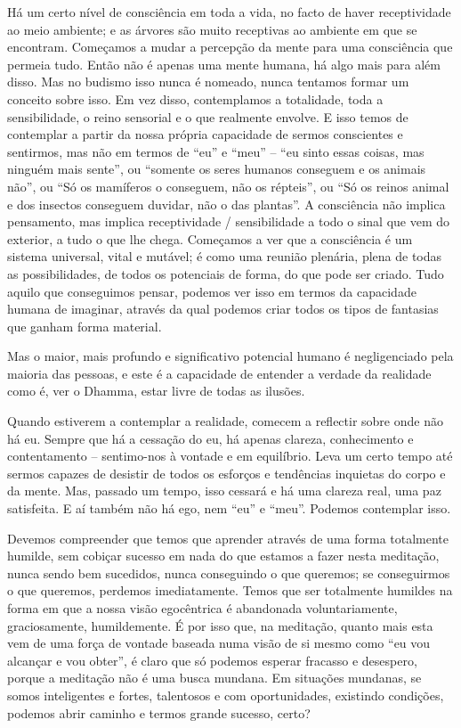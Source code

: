 Há um certo nível de consciência em toda a vida, no facto de haver receptividade
ao meio ambiente; e as árvores são muito receptivas ao ambiente em que se
encontram. Começamos a mudar a percepção da mente para uma consciência que
permeia tudo. Então não é apenas uma mente humana, há algo mais para além disso.
Mas no budismo isso nunca é nomeado, nunca tentamos formar um conceito sobre
isso. Em vez disso, contemplamos a totalidade, toda a sensibilidade, o reino
sensorial e o que realmente envolve. E isso temos de contemplar a partir da
nossa própria capacidade de sermos conscientes e sentirmos, mas não em termos de
``eu'' e ``meu'' -- ``eu sinto essas coisas, mas ninguém mais sente'', ou
``somente os seres humanos %
conseguem e os animais não'', ou ``Só os mamíferos o
conseguem, não os répteis'', ou ``Só os reinos animal e dos insectos conseguem
duvidar, não o das plantas''. A consciência não implica pensamento, mas implica
receptividade / sensibilidade a todo o sinal que vem do exterior, a tudo o que
lhe chega. Começamos a ver que a consciência é um sistema universal, vital e
mutável; é como uma reunião plenária, plena de todas as possibilidades, de todos
os potenciais de forma, do que pode ser criado. Tudo aquilo que conseguimos
pensar, podemos ver isso em termos da capacidade humana de imaginar, através da
qual podemos criar todos os tipos de fantasias que ganham forma material.

Mas o maior, mais profundo e significativo potencial humano é negligenciado pela
maioria das pessoas, e este é a capacidade de entender a verdade da realidade
como é, ver o Dhamma, estar livre de todas as ilusões.

Quando estiverem a contemplar a realidade, comecem a reflectir sobre onde não há
eu. Sempre que há a cessação do eu, há apenas clareza, conhecimento e
contentamento -- sentimo-nos à vontade e em equilíbrio. Leva um certo tempo até
sermos capazes de desistir de todos os esforços e tendências inquietas do corpo
e da mente. Mas, passado um tempo, isso cessará e há uma clareza real, uma paz
satisfeita. E aí também não há ego, nem ``eu'' e ``meu''. Podemos contemplar
isso.

Devemos compreender que temos que aprender através de uma forma totalmente
humilde, sem cobiçar sucesso em nada do que estamos a fazer nesta meditação,
nunca sendo bem sucedidos, nunca conseguindo o que queremos; se conseguirmos o
que queremos, perdemos imediatamente. Temos que ser totalmente humildes na forma
em que a nossa visão egocêntrica é abandonada voluntariamente, graciosamente,
humildemente. É por isso que, na meditação, quanto mais esta vem de uma força de
vontade baseada numa visão de si mesmo como ``eu vou alcançar e vou obter'', é
claro que só podemos esperar fracasso e desespero, porque a meditação não é uma
busca mundana. Em situações mundanas, se somos inteligentes e fortes, talentosos
e com oportunidades, existindo condições, podemos abrir caminho e termos grande
sucesso, certo?

